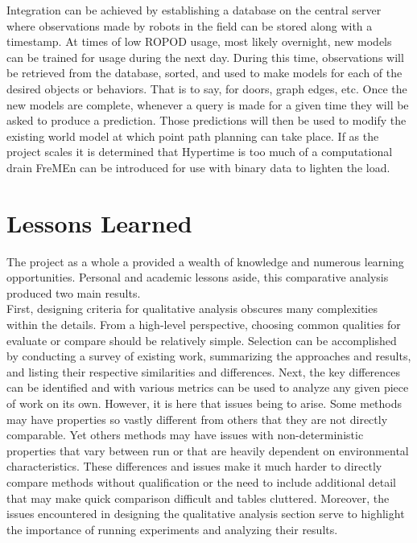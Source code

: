     Integration can be achieved by establishing a database on the central server
    where observations made by robots in the field can be stored along
    with a timestamp. At times of low ROPOD usage, most likely overnight, new
    models can be trained for usage during the next day. During this time,
    observations will be retrieved from the database, sorted, and used to make
    models for each of the desired objects or behaviors. That is to say, for
    doors, graph edges, etc. Once the new models are complete, whenever a query is
    made for a given time they will be asked to produce a prediction.
    Those predictions will then be used to modify the existing world model at
    which point path planning can take place. If as the project scales it is
    determined that Hypertime is too much of a computational drain FreMEn
    can be introduced for use with binary data to lighten the load. \\


    \section{ Lessons Learned }

    The project as a whole a provided a wealth of knowledge and
    numerous learning opportunities. Personal and academic lessons aside, this
    comparative analysis produced two main results.\\

    First, designing criteria for qualitative analysis obscures many complexities
    within the details. From a high-level perspective, choosing common
    qualities for evaluate or compare should be relatively simple.
    Selection can be accomplished by conducting a survey of existing work,
    summarizing the approaches and results, and listing their respective
    similarities and differences. Next, the key differences can be
    identified and with various metrics can be used to analyze any given piece of
    work on its own. However, it is here that issues being to arise. Some methods
    may have properties so vastly different from others that they are not
    directly comparable. Yet others methods may have issues with non-deterministic
    properties that vary between run or that are heavily dependent on environmental
    characteristics. These differences and issues make it much harder to directly
    compare methods without qualification or the need to include additional detail
    that may make quick comparison difficult and tables cluttered. Moreover,
    the issues encountered in designing the qualitative analysis section serve
    to highlight the importance of running experiments and analyzing their results. \\


